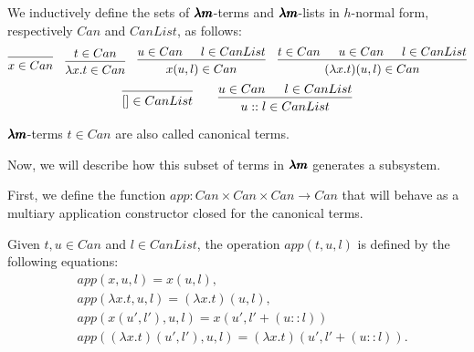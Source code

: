\begin{definition}
  \label{canonical_terms}
  We inductively define the sets of $\pmb{\lambda m}$-terms and $\pmb{\lambda m}$-lists in $h$-normal form, respectively $Can$ and $CanList$, as follows:
  \[
    \begin{prooftree}
      \infer0{ x \in Can } 
    \end{prooftree}
    \quad
    \begin{prooftree}
      \hypo{ t \in Can }
      \infer1{ \lambda x . t \in Can } 
    \end{prooftree}
    \quad
    \begin{prooftree}
      \hypo{ u \in Can }            
      \hypo{ l \in CanList }
      \infer2{ x(u, l) \in Can }
    \end{prooftree}
    \quad
    \begin{prooftree}
      \hypo{ t \in Can } 
      \hypo{ u \in Can }            
      \hypo{ l \in CanList }
      \infer3{ (\lambda x. t)(u, l) \in Can }
    \end{prooftree}
  \]
  \[
    \begin{prooftree}
      \infer0{ [] \in CanList } 
    \end{prooftree}
    \qquad
    \begin{prooftree}
      \hypo{ u \in Can }            
      \hypo{ l \in CanList }
      \infer2{ u::l \in CanList }
    \end{prooftree}
  \]

  $\pmb{\lambda m}$-terms $t \in Can$ are also called canonical terms.
\end{definition}

Now, we will describe how this subset of terms in $\pmb{\lambda m}$ generates a subsystem.

First, we define the function $app : Can \times Can \times Can \to Can$ that will behave as a multiary application constructor closed for the canonical terms.

\begin{definition}
  Given $t, u \in Can$ and $l \in CanList$, the operation $app(t, u, l)$ is defined by the following equations:
  \begin{align*}
    & app(x, u, l) = x(u, l), \\
    & app(\lambda x. t, u, l) = (\lambda x. t)(u, l), \\ 
    & app(x(u', l'), u, l) = x(u', l' + (u::l)) \\
    & app((\lambda x. t)(u', l'), u, l) = (\lambda x. t)(u', l'+(u::l)).
  \end{align*}  
\end{definition}

